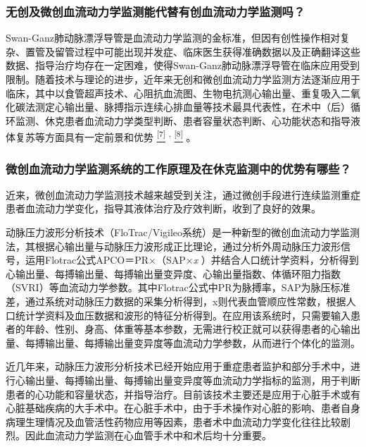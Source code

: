 \subsubsection{无创及微创血流动力学监测能代替有创血流动力学监测吗？}

Swan-Ganz肺动脉漂浮导管是血流动力学监测的金标准，但因有创性操作相对复杂、置管及留管过程中可能出现并发症、临床医生获得准确数据以及正确翻译这些数据、指导治疗均存在一定困难，使得Swan-Ganz肺动脉漂浮导管在临床应用受到限制。随着技术与理论的进步，近年来无创和微创血流动力学监测方法逐渐应用于临床，其中以食管超声技术、心阻抗血流图、生物电抗测心输出量、重复吸入二氧化碳法测定心输出量、脉搏指示连续心排血量等技术最具代表性，在术中（后）循环监测、休克患者血流动力学类型判断、患者容量状态判断、心功能状态和指导液体复苏等方面具有一定前景和优势
\protect\hyperlink{text00010.htmlux5cux23ch7-9}{\textsuperscript{{[}7{]}}}
\textsuperscript{,}
\protect\hyperlink{text00010.htmlux5cux23ch8-9}{\textsuperscript{{[}8{]}}}
。

\subsubsection{微创血流动力学监测系统的工作原理及在休克监测中的优势有哪些？}

近来，微创血流动力学监测技术越来越受到关注，通过微创手段进行连续监测重症患者血流动力学变化，指导其液体治疗及疗效判断，收到了良好的效果。

动脉压力波形分析技术（FloTrac/Vigileo系统）是一种新型的微创血流动力学监测法，其根据心输出量与动脉压力波形成正比理论，通过分析外周动脉压力波形信号，运用Flotrac公式APCO＝PR×（SAP×\emph{x}
）并结合人口统计学资料，分析得到心输出量、每搏输出量、每搏输出量变异度、心输出量指数、体循环阻力指数（SVRI）等血流动力学参数。其中Flotrac公式中PR为脉搏率，SAP为脉压标准差，通过系统对动脉压力数据的采集分析得到，x则代表血管顺应性常数，根据人口统计学资料及血压数据和波形的特征分析得到。在应用该系统时，只需要输入患者的年龄、性别、身高、体重等基本参数，无需进行校正就可以获得患者的心输出量、每搏输出量、每搏输出量变异度等血流动力学参数，从而进行个体化的监测。

近几年来，动脉压力波形分析技术已经开始应用于重症患者监护和部分手术中，进行心输出量、每搏输出量、每搏输出量变异度等血流动力学指标的监测，用于判断患者的心功能和容量状态，并指导治疗。目前该技术主要还是应用于心脏手术或有心脏基础疾病的大手术中。在心脏手术中，由于手术操作对心脏的影响、患者自身病理生理情况及血管活性药物应用等因素，患者术中血流动力学变化往往比较剧烈。因此血流动力学监测在心血管手术中和术后均十分重要。

